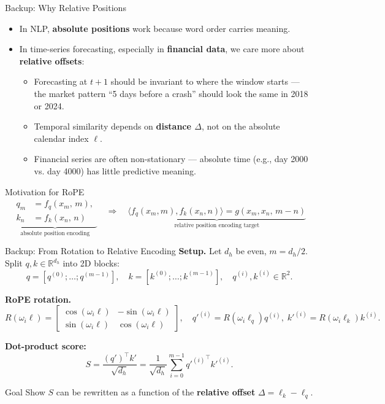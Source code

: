 \documentclass[aspectratio=169,xcolor=dvipsnames]{beamer}
\begin{document}
\begin{frame}{Backup: Why Relative Positions}
\small
\begin{itemize}
  \item In NLP, \textbf{absolute positions} work because word order carries meaning.
  \item In time-series forecasting, especially in \textbf{financial data}, we care more about \textbf{relative offsets}:
    \begin{itemize}
      \item Forecasting at $t{+}1$ should be invariant to where the window starts — the market pattern ``5 days before a crash'' should look the same in 2018 or 2024.
      \item Temporal similarity depends on \textbf{distance $\Delta$}, not on the absolute calendar index $\ell$.
      \item Financial series are often non-stationary — absolute time (e.g., day 2000 vs. day 4000) has little predictive meaning.
    \end{itemize}

\end{itemize}

\begin{alertblock}{Motivation for RoPE}
\vspace{-1mm}
\centering
\[
\underbrace{
\begin{aligned}
q_m &= f_q(x_m,\, m),\\
k_n &= f_k(x_n,\, n)
\end{aligned}
}_{\text{absolute position encoding}}
\quad
\Longrightarrow
\quad
\underbrace{
\langle f_q(x_m,m), f_k(x_n,n) \rangle
= g(x_m, x_n,\, m-n)
}_{\text{relative position encoding target}}
\]
\vspace{-1mm}
\end{alertblock}
\end{frame}

\begin{frame}{Backup: From Rotation to Relative Encoding}
\footnotesize
\textbf{Setup.}
Let $d_h$ be even, $m=d_h/2$.
Split $q,k\in\mathbb{R}^{d_h}$ into 2D blocks:
\[
q=[q^{(0)};\ldots;q^{(m-1)}],\quad
k=[k^{(0)};\ldots;k^{(m-1)}],\quad
q^{(i)},k^{(i)}\in\mathbb{R}^2.
\]

\textbf{RoPE rotation.}
\[
R(\omega_i \ell)=
\begin{bmatrix}
\cos(\omega_i \ell)&-\sin(\omega_i \ell)\\
\sin(\omega_i \ell)&\cos(\omega_i \ell)
\end{bmatrix},\quad
q'^{(i)}=R(\omega_i\ell_q)q^{(i)},\;
k'^{(i)}=R(\omega_i\ell_k)k^{(i)}.
\]

\textbf{Dot-product score:}
\[
S=\frac{(q')^\top k'}{\sqrt{d_h}}
=\frac{1}{\sqrt{d_h}}\sum_{i=0}^{m-1}{q'^{(i)}}^\top k'^{(i)}.
\]

\begin{block}{Goal}
Show $S$ can be rewritten as a function of the \textbf{relative offset} 
$\Delta=\ell_k-\ell_q$.
\end{block}
\end{frame}
\end{document}

